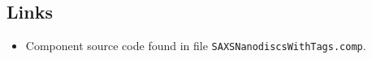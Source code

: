 \subsection*{Links}
\begin{itemize}
  \item Component source code found in file \texttt{SAXSNanodiscsWithTags.comp}.
\end{itemize}
